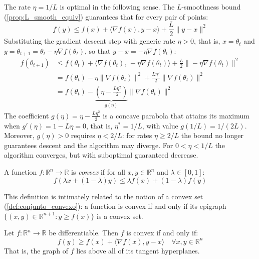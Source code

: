 The rate \(\eta = 1/L\) is optimal in the following sense. The \(L\)-smoothness bound
(\autoref{prop:L_smooth_equiv}) guarantees that for every pair of points:
\[
	f(y) \leq f(x) + \langle \nabla f(x), y - x \rangle + \frac{L}{2}\|y - x\|^2
\]
Substituting the gradient descent step with generic rate \(\eta > 0\),
that is, \(x = \theta_t\) and \(y = \theta_{t+1} = \theta_t - \eta\nabla f(\theta_t)\),
so that \(y - x = -\eta\nabla f(\theta_t)\):
\begin{align*}
	f(\theta_{t+1})
		&\leq f(\theta_t) + \langle \nabla f(\theta_t),\, -\eta\nabla f(\theta_t) \rangle
			+ \frac{L}{2}\|\!-\eta\nabla f(\theta_t)\|^2 \\
		&= f(\theta_t) - \eta\|\nabla f(\theta_t)\|^2
			+ \frac{L\eta^2}{2}\|\nabla f(\theta_t)\|^2 \\
		&= f(\theta_t)
			- \underbrace{\left(\eta - \frac{L\eta^2}{2}\right)}_{g(\eta)}
			\|\nabla f(\theta_t)\|^2
\end{align*}
The coefficient \(g(\eta) = \eta - \frac{L\eta^2}{2}\) is a concave parabola that attains its maximum when \(g'(\eta) = 1 - L\eta = 0\), that is, \(\eta^* = 1/L\), with value \(g(1/L) = 1/(2L)\). Moreover, \(g(\eta) > 0\) requires \(\eta < 2/L\): for rates \(\eta \geq 2/L\) the bound no longer guarantees descent and the algorithm may diverge. For \(0 < \eta < 1/L\) the algorithm converges, but with suboptimal guaranteed decrease.

\begin{definition}\label{def:convex_function}
	A function \(f: \mathbb{R}^n \to \mathbb{R}\) is \textit{convex} if for all \(x, y \in \mathbb{R}^n\) and \(\lambda \in [0,1]\):
	\[
		f(\lambda x + (1-\lambda)y) \leq \lambda f(x) + (1-\lambda)f(y)
	\]
\end{definition}

This definition is intimately related to the notion of a convex set (\autoref{def:conjunto_convexo}): a function is convex if and only if its epigraph $\{(x,y) \in \mathbb{R}^{n+1} : y \geq f(x)\}$ is a convex set.

\begin{proposition}\label{prop:convex_equiv}
	Let \(f: \mathbb{R}^n \to \mathbb{R}\) be differentiable. Then \(f\) is convex if and only if:
	\[
		f(y) \geq f(x) + \langle \nabla f(x), y - x \rangle \quad \forall x, y \in \mathbb{R}^n
	\]
	That is, the graph of \(f\) lies above all of its tangent hyperplanes.
\end{proposition}


